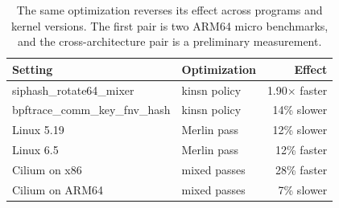 \begin{table}[t]
\footnotesize
\centering
\caption{The same optimization reverses its effect across programs and kernel versions. The first pair is two ARM64 micro benchmarks, and the cross-architecture pair is a preliminary measurement.}
\label{tab:reversal}
\begin{tabular}{llr}
\hline
Setting & Optimization & Effect \\
\hline
siphash\_rotate64\_mixer & kinsn policy & 1.90$\times$ faster \\
bpftrace\_comm\_key\_fnv\_hash & kinsn policy & 14\% slower \\
\hline
Linux 5.19 & Merlin pass~\cite{mao2024merlin} & 12\% slower \\
Linux 6.5 & Merlin pass~\cite{mao2024merlin} & 12\% faster \\
\hline
Cilium on x86 & mixed passes & 28\% faster \\
Cilium on ARM64 & mixed passes & 7\% slower \\
\hline
\end{tabular}
\end{table}

